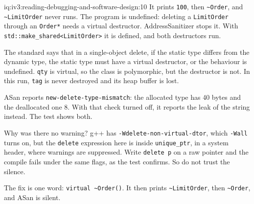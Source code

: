 \begin{solution}{iq:iv3:reading-debugging-and-software-design:10}
It prints \texttt{100}, then \texttt{\textasciitilde{}Order}, and \texttt{\textasciitilde{}LimitOrder} never runs. The program is undefined: deleting a \texttt{LimitOrder} through an \texttt{Order*} needs a virtual destructor. AddressSanitizer stops it. With \texttt{std::make\_shared<LimitOrder>} it is defined, and both destructors run.

The standard says that in a single-object delete, if the static type differs from the dynamic type, the static type must have a virtual destructor, or the behaviour is undefined. \texttt{qty} is virtual, so the class is polymorphic, but the destructor is not. In this run, \texttt{tag} is never destroyed and its heap buffer is lost.

ASan reports \texttt{new-delete-type-mismatch}: the allocated type has 40 bytes and the deallocated one 8. With that check turned off, it reports the leak of the string instead. The test shows both.

Why was there no warning? g++ has \texttt{-Wdelete-non-virtual-dtor}, which \texttt{-Wall} turns on, but the \texttt{delete} expression here is inside \texttt{unique\_ptr}, in a system header, where warnings are suppressed. Write \texttt{delete p} on a raw pointer and the compile fails under the same flags, as the test confirms. So do not trust the silence.

The fix is one word: \texttt{virtual \textasciitilde{}Order()}. It then prints \texttt{\textasciitilde{}LimitOrder}, then \texttt{\textasciitilde{}Order}, and ASan is silent.


\end{solution}

